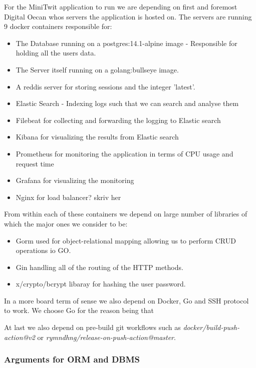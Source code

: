 For the MiniTwit application to run we are depending on first and foremost Digital Oecan whos servers the application is 
hosted on. The servers are running 9 docker containers responsible for: 
\begin{itemize}
    \item The Database running on a postgres:14.1-alpine image - Responsible for holding all the users data.
    \item The Server itself running on a golang:bullseye image.
    \item A reddis server for storing sessions and the integer 'latest'.
    \item Elastic Search - Indexing logs such that we can search and analyse them
    \item Filebeat for collecting and forwarding the logging to Elastic search
    \item Kibana for visualizing the results from Elastic search
    \item Prometheus for monitoring the application in terms of CPU usage and request time
    \item Grafana for visualizing the monitoring
    \item Nginx for load balancer? skriv her
\end{itemize}

From within each of these containers we depend on large number of libraries of which the major ones we consider to be:
\begin{itemize}
    \item Gorm used for object-relational mapping allowing us to perform CRUD operations io GO.
    \item Gin handling all of the routing of the HTTP methods.
    \item x/crypto/bcrypt libaray for hashing the user password.
\end{itemize}

In a more board term of sense we also depend on Docker, Go and SSH protocol to work. We choose Go for the reason being 
that  

At last we also depend on pre-build git workflows such as \textit{docker/build-push-action@v2} or \textit{rymndhng/release-on-push-action@master}.
\subsubsection{Arguments for ORM and DBMS}

